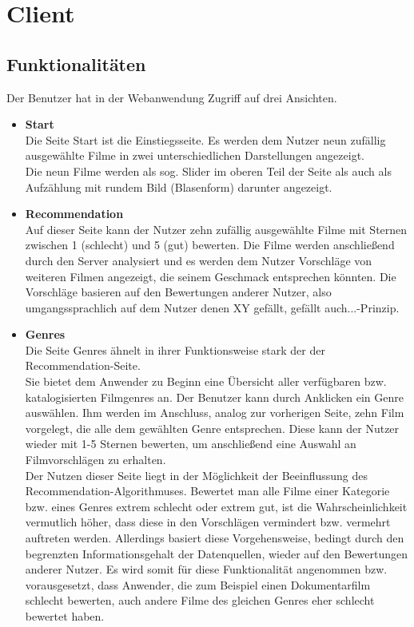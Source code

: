 \section{Client}
\subsection{Funktionalitäten}
Der Benutzer hat in der Webanwendung Zugriff auf drei Ansichten.
\begin{itemize}
  \item \textbf{Start}\\
  	Die Seite \glqq Start\grqq{} ist die Einstiegsseite. Es werden dem Nutzer neun zufällig ausgewählte Filme in zwei unterschiedlichen Darstellungen angezeigt.\\
  	Die neun Filme werden als sog. \glqq Slider\grqq{} im oberen Teil der Seite als auch als Aufzählung mit rundem Bild (\glqq Blasenform\grqq) darunter angezeigt.
  \item \textbf{Recommendation}\\
  	Auf dieser Seite kann der Nutzer zehn zufällig ausgewählte Filme mit Sternen zwischen 1 (schlecht) und 5 (gut) bewerten. Die Filme werden anschließend durch den Server analysiert und es werden dem Nutzer Vorschläge von weiteren Filmen angezeigt, die seinem Geschmack entsprechen könnten. Die Vorschläge basieren auf den Bewertungen anderer Nutzer, also umgangssprachlich auf dem \glqq Nutzer denen XY gefällt, gefällt auch...\grqq-Prinzip.
  \item \textbf{Genres}\\
  	Die Seite \glqq Genres\grqq{} ähnelt in ihrer Funktionsweise stark der der \glqq Recommendation\grqq-Seite.\\
  	Sie bietet dem Anwender zu Beginn eine Übersicht aller verfügbaren bzw. katalogisierten Filmgenres an. Der Benutzer kann durch Anklicken ein Genre auswählen. Ihm werden im Anschluss, analog zur vorherigen Seite, zehn Film vorgelegt, die alle dem gewählten Genre entsprechen. Diese kann der Nutzer wieder mit 1-5 Sternen bewerten, um anschließend eine Auswahl an Filmvorschlägen zu erhalten.\\
  	Der Nutzen dieser Seite liegt in der Möglichkeit der Beeinflussung des Recommendation-Algorithmuses. Bewertet man alle Filme einer Kategorie bzw. eines Genres extrem schlecht oder extrem gut, ist die Wahrscheinlichkeit vermutlich höher, dass diese in den Vorschlägen vermindert bzw. vermehrt auftreten werden. Allerdings basiert diese Vorgehensweise, bedingt durch den begrenzten Informationsgehalt der Datenquellen, wieder auf den Bewertungen anderer Nutzer. Es wird somit für diese Funktionalität angenommen bzw. vorausgesetzt, dass Anwender, die zum Beispiel einen Dokumentarfilm schlecht bewerten, auch andere Filme des gleichen Genres eher schlecht bewertet haben.  	
  	\end{itemize}


